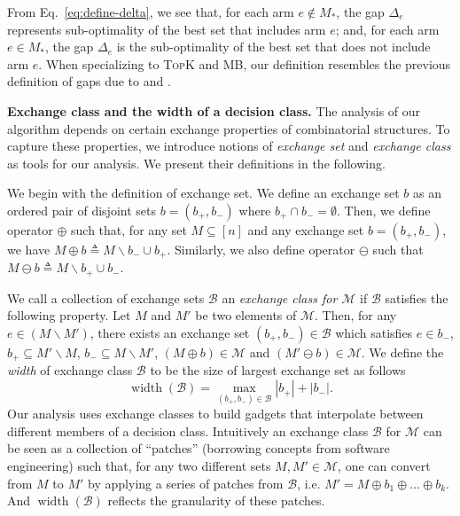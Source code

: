 \documentclass{article}
\newcommand{\M}{\mathcal M}
\newcommand{\B}{\mathcal B}
\newcommand{\del}{\backslash}
\DeclareMathOperator{\rank}{width}
\newcommand{\MultiIdent}{\textsc{TopK}\xspace}
\newcommand{\MultiBandit}{\textsc{MB}\xspace}
\begin{document}
From Eq.~\eqref{eq:define-delta}, we see that, for each arm $e\not\in M_*$, the gap $\Delta_e$ represents sub-optimality of the best set that includes arm $e$; and, for each arm $e\in M_*$, the gap $\Delta_e$ is the sub-optimality of the best set that does not include arm $e$.
When specializing to \MultiIdent and \MultiBandit, our definition resembles the previous definition of gaps due to \citet{kalyanakrishnan2012pac} and \citet{gabillon2012best}.



\textbf{Exchange class and the width of a decision class.} 
The analysis of our algorithm depends on certain exchange properties of combinatorial structures.
To capture these properties, we introduce notions of \emph{exchange set} and \emph{exchange class} as tools for our analysis.
We present their definitions in the following.


We begin with the definition of exchange set. 
We define an exchange set $b$ as an ordered pair of disjoint sets $b=(b_+,b_-)$ where $b_+\cap b_- = \emptyset$.
Then, we define operator $\oplus$ such that, for any set $M \subseteq [n]$ and any exchange set $b=(b_+,b_-)$, we have $M\oplus b \triangleq M\del b_- \cup b_+$.
Similarly, we also define operator $\ominus$ such that $M\ominus b \triangleq M\del b_+\cup b_-$.

We call a collection of exchange sets $\B$ an \emph{exchange class for $\M$} if $\B$ satisfies the following property.
Let $M$ and $M'$ be two  elements of $\M$.
Then, for any $e \in (M\del M')$, there exists an exchange set $(b_+,b_-)\in \B$ which satisfies $e\in b_-$, $b_+ \subseteq M'\del M$, $b_- \subseteq M \del M'$, $(M\oplus b) \in \M$ and $(M'\ominus b) \in \M$.
We define the \emph{width} of exchange class $\B$ to be the size of largest exchange set as follows
\begin{equation}
\label{eq:width}
\rank(\B) = \max_{(b_+,b_-) \in \B} |b_+|+|b_-|.
\end{equation}
Our analysis uses exchange classes to build gadgets that interpolate between different members of a decision class.
Intuitively an exchange class $\B$ for $\M$ can be seen as a collection of ``patches'' (borrowing concepts from software engineering) such that, for any two different sets $M,M'\in \M$, one can convert from $M$ to $M'$ by applying a series of patches from $\B$, i.e. $M'=M\oplus b_1 \oplus \ldots \oplus b_k$. And $\rank(\B)$ reflects the granularity of these patches.
\end{document}
